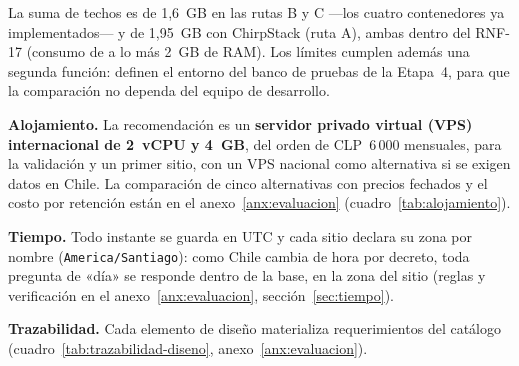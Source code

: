 La suma de techos es de 1,6~GB en las rutas B y C —los cuatro contenedores ya implementados— y de
1,95~GB con ChirpStack (ruta A), ambas dentro del RNF-17 (consumo de a lo más 2~GB de RAM). Los
límites cumplen además una segunda función: definen el entorno del banco de pruebas
de la Etapa~4, para que la comparación no dependa del equipo de desarrollo.

\textbf{Alojamiento.} La recomendación es un \textbf{servidor privado virtual (VPS) internacional de 2~vCPU y 4~GB},
del orden de CLP~6\,000 mensuales, para la validación y un primer sitio, con un VPS nacional como alternativa si se
exigen datos en Chile. La comparación de cinco alternativas con precios fechados y el costo por retención están en el
anexo~\ref{anx:evaluacion} (cuadro~\ref{tab:alojamiento}).

\textbf{Tiempo.} Todo instante se guarda en UTC y cada sitio declara su zona por nombre (\texttt{America/Santiago}):
como Chile cambia de hora por decreto, toda pregunta de «día» se responde dentro de la base, en la zona del sitio
(reglas y verificación en el anexo~\ref{anx:evaluacion}, sección~\ref{sec:tiempo}).

\textbf{Trazabilidad.} Cada elemento de diseño materializa requerimientos del catálogo
(cuadro~\ref{tab:trazabilidad-diseno}, anexo~\ref{anx:evaluacion}).
